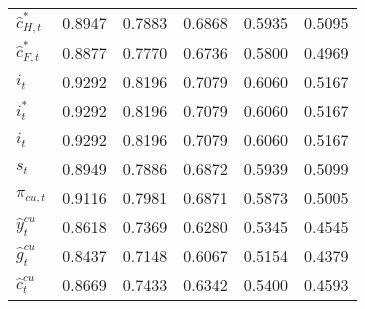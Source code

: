 \begin{center}
\begin{longtable}{lccccc}
${\hat c_{H,t}^*}         $	 & 	    0.8947	 & 	    0.7883	 & 	    0.6868	 & 	    0.5935	 & 	    0.5095 \\ 
${\hat c_{F,t}^*}         $	 & 	    0.8877	 & 	    0.7770	 & 	    0.6736	 & 	    0.5800	 & 	    0.4969 \\ 
${i_t}                    $	 & 	    0.9292	 & 	    0.8196	 & 	    0.7079	 & 	    0.6060	 & 	    0.5167 \\ 
${i_t^*}                  $	 & 	    0.9292	 & 	    0.8196	 & 	    0.7079	 & 	    0.6060	 & 	    0.5167 \\ 
${i_t}                    $	 & 	    0.9292	 & 	    0.8196	 & 	    0.7079	 & 	    0.6060	 & 	    0.5167 \\ 
${s_t}                    $	 & 	    0.8949	 & 	    0.7886	 & 	    0.6872	 & 	    0.5939	 & 	    0.5099 \\ 
${\pi_{cu,t}}             $	 & 	    0.9116	 & 	    0.7981	 & 	    0.6871	 & 	    0.5873	 & 	    0.5005 \\ 
${\hat y_t^{cu}}          $	 & 	    0.8618	 & 	    0.7369	 & 	    0.6280	 & 	    0.5345	 & 	    0.4545 \\ 
${\hat g_t^{cu}}          $	 & 	    0.8437	 & 	    0.7148	 & 	    0.6067	 & 	    0.5154	 & 	    0.4379 \\ 
${\hat c_t^{cu}}          $	 & 	    0.8669	 & 	    0.7433	 & 	    0.6342	 & 	    0.5400	 & 	    0.4593 \\ 
\end{longtable}
 \end{center}
